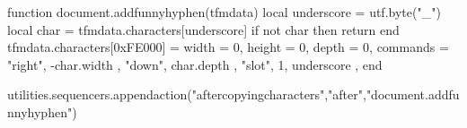 \startluacode

    function document.addfunnyhyphen(tfmdata)
        local underscore = utf.byte("_")
        local char       = tfmdata.characters[underscore]
        if not char then return end
        tfmdata.characters[0xFE000]   = {
            width    = 0,
            height   = 0,
            depth    = 0,
            commands = {
                { "right", -char.width },
                { "down", char.depth },
                { "slot", 1, underscore },
            }
        }
    end


utilities.sequencers.appendaction("aftercopyingcharacters","after","document.addfunnyhyphen")

\stopluacode

\setuplanguage
    [de-DE]
    [spacing=packed,
    lefthyphenmin=2,
    righthyphenmin=2]



\setuphyphenation
    [method=traditional]


\sethyphenationfeatures
    [strict]


\setupwhitespace[none]

\usemodule[layout]
\chardef{}
\def\charwidthlanguage{\currentmainlanguage}




\startmode[A4]
    \setuppapersize
        [A4]
    \setuplayout
        [setups=*lessstrict,
         backspace=2.18cm,
         width=middle,
         topspace=2cm,
         bottomspace=1.25cm,
         height=middle,
         header=0cm,
         footer=1.5cm]
\stopmode



\startsetups[*lessstrict]
    \setup[reset]
\stopsetups


\setuppagenumbering
    [page=,
     alternative=doublesided,
     location={bottom,right}]


